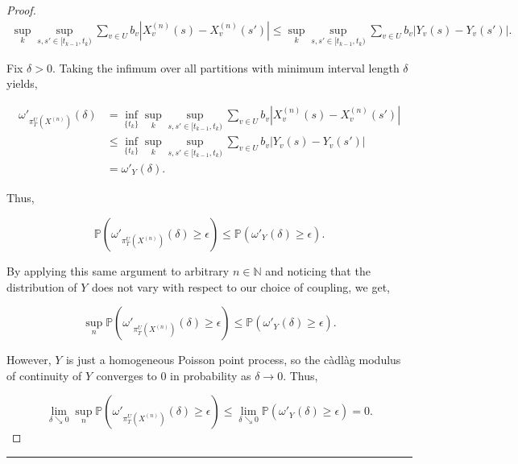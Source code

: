 \documentclass[12pt]{article}
\newcommand{\mb}{\mathbb}
\newcommand{\ra}{\rightarrow}
\newcommand{\ep}{\epsilon}
\newcommand{\lin}{\rule{\linewidth}{0.4 pt}}
\newcommand{\pr}{\mb{P}}							%
\renewcommand{\v}{v}							%
\renewcommand{\U}{U}							%
\renewcommand{\b}{b}							%
\newcommand{\T}{T}								%
\renewcommand{\t}{t}							%
\newcommand{\proj}{\pi}							%
\renewcommand{\tt}{s}							%
\newcommand{\ttt}{s'}							%
\newcommand{\X}{X}								%
\newcommand{\vsi}[1]{^{#1}}						%
\newcommand{\cind}[1]{_{#1}}					%
\newcommand{\tp}[1]{(#1)}						%
\newcommand{\tip}[1]{#1}						%
\newcommand{\ts}[1]{_{#1}}						%
\newcommand{\sln}[1]{^{(#1)}}					%
\newcommand{\indx}[1]{_{#1}}					%
\newcommand{\XX}{Y}								%
\renewcommand{\it}{k}							%
\begin{document}
\begin{proof}
\begin{align*}
\sup_\it\sup_{\tt,\ttt \in [\t\indx{\it-1},\t\indx{\it})} \sum_{\v\in \U} \b\cind{\v}|\X\sln{n}\cind{\v}\tp{\tt} - \X\sln{n}\cind{\v}\tp{\ttt}|\leq \sup_\it\sup_{\tt,\ttt \in [\t\indx{\it-1},\t\indx{\it})} \sum_{\v\in \U} \b\cind{\v}|\XX\cind{\v}\tp{\tt} - \XX\cind{\v}\tp{\ttt}|.
\end{align*}

Fix \(\delta > 0\). Taking the infimum over all partitions with minimum interval length \(\delta\) yields,

\begin{align*}
\omega'_{\proj\vsi{\U}\ts{\T}\left(\X\sln{n}\cind{}\tip{}\right)}(\delta) &= \inf_{\{\t\indx{\it}\}}\sup_\it\sup_{\tt,\ttt \in [\t\indx{\it-1},\t\indx{\it})} \sum_{\v\in \U} \b\cind{\v}|\X\sln{n}\cind{\v}\tp{\tt} - \X\sln{n}\cind{\v}\tp{\ttt}|\\
&\leq \inf_{\{\t\indx{\it}\}}\sup_\it\sup_{\tt,\ttt \in [\t\indx{\it-1},\t\indx{\it})} \sum_{\v\in \U} \b\cind{\v}|\XX\cind{\v}\tp{\tt} - \XX\cind{\v}\tp{\ttt}|\\
&= \omega'_{\XX\cind{}\tip{}}(\delta).
\end{align*}

Thus,

\[\pr\left(\omega'_{\proj\vsi{\U}\ts{\T}\left(\X\sln{n}\cind{}\tip{}\right)}(\delta) \geq \ep\right) \leq \pr\left(\omega'_{\XX\cind{}\tip{}}(\delta) \geq \ep\right).\]

By applying this same argument to arbitrary \(n\in \mb{N}\) and noticing that the distribution of \(\XX\cind{}\tip{}\) does not vary with respect to our choice of coupling, we get,

\[\sup_{n}\pr\left(\omega'_{\proj\vsi{\U}\ts{\T}\left(\X\sln{n}\cind{}\tip{}\right)}(\delta)\geq \ep\right) \leq \pr\left(\omega'_{\XX\cind{}\tip{}}(\delta) \geq \ep\right).\]

However, \(\XX\cind{}\tip{}\) is just a homogeneous Poisson point process, so the c\`adl\`ag modulus of continuity of \(\XX\cind{}\tip{}\) converges to 0 in probability as \(\delta \ra 0\). Thus,

\[\lim_{\delta \searrow 0}\sup_{n}\pr\left(\omega'_{\proj\vsi{\U}\ts{\T}\left(\X\sln{n}\cind{}\tip{}\right)}(\delta) \geq \ep\right) \leq \lim_{\delta\searrow 0}\pr\left(\omega'_{\XX\cind{}\tip{}}(\delta)\geq \ep\right) = 0.\]


\end{proof}

\lin
\end{document}
